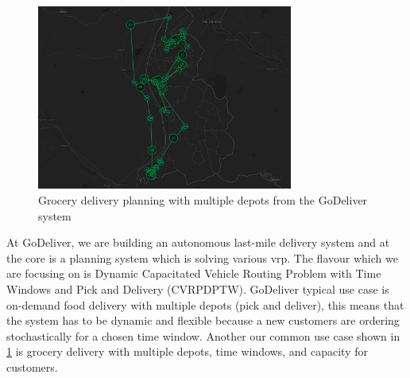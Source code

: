 \begin{figure}[ht]
    \centering
    \includegraphics[width=0.75\textwidth]{resources/intro/hofkorb.png}
    \caption{Grocery delivery planning with multiple depots from the GoDeliver system}
    \label{fig:hofkorb}
\end{figure}

At GoDeliver, we are building an autonomous last-mile delivery system and at the core is a planning system which is solving various \gls{vrp}. The flavour which we are focusing on is Dynamic Capacitated Vehicle Routing Problem with Time Windows and Pick and Delivery (CVRPDPTW). GoDeliver typical use case is on-demand food delivery with multiple depots (pick and deliver), this means that the system has to be dynamic and flexible because a new customers are ordering stochastically for a chosen time window. Another our common use case shown in \ref{fig:hofkorb} is grocery delivery with multiple depots, time windows, and capacity for customers.
